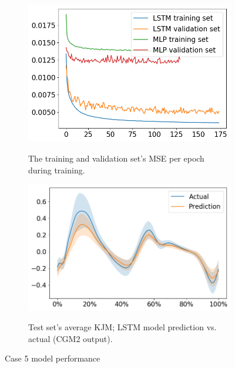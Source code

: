 \documentclass[../main.tex]{subfiles}
\begin{document}
\begin{figure}[!htb]
    \captionsetup[subfigure]{aboveskip=-12pt}
     \centering
     \begin{subfigure}[b]{0.475\textwidth}
         \centering
         \includegraphics[width=\textwidth]{img/results/training_history/Case5_LSTMvsMLP_training.png}
         \label{fig:case5-training-performance}
         \caption{The training and validation set's \ac{MSE} per epoch during training.}
     \end{subfigure}
     \hfill
     \begin{subfigure}[b]{0.515\textwidth}
         \centering
         \includegraphics[width=\textwidth]{img/results/test_prediction_evaluation/Case5_LSTM_test_prediction.png}
         \label{fig:case5-prediction-performance}
         \caption{Test set's average \ac{KJM}; LSTM model prediction vs. actual (CGM2 output).}
     \end{subfigure}
    \caption{Case 5 model performance}
    \label{fig:case5-performance-plots}
\end{figure}

\end{document}

